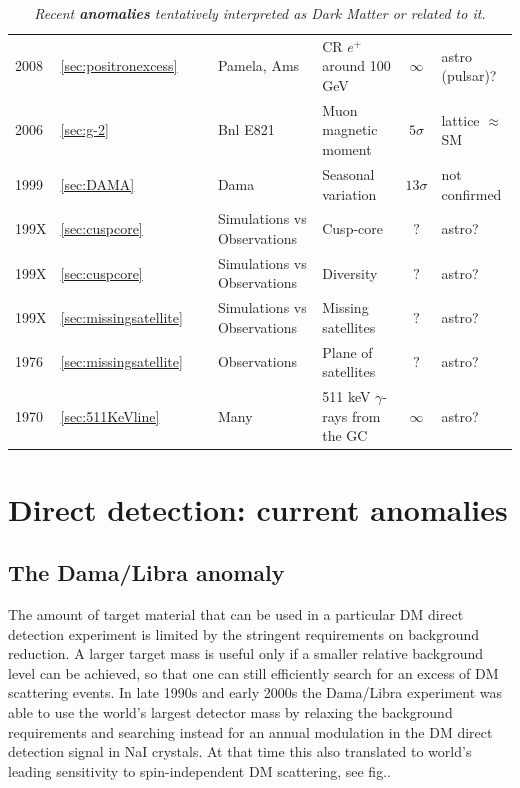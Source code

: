 \begin{table}[p]
\begin{tabular}{lllllcl}
%
\rowcolor{yellow!20} 2008 & \ref{sec:positronexcess}&\cite{positronexcess} & {\sc Pamela}, {\sc Ams} & CR $e^+$ around 100 GeV & $\infty$ 
& astro (pulsar)?\\
%
\rowcolor{red!50} 2006 & \ref{sec:g-2}&\cite{muong-2measurements} & {\sc Bnl E821} & Muon magnetic moment & $5\sigma$ 
& lattice $\approx$ SM\\
%
\rowcolor{red!30}1999 & \ref{sec:DAMA}&\cite{DAMA} & {\sc Dama} & Seasonal variation & $13\sigma$ 
& not confirmed\\
%
\rowcolor{orange!20}199X & \ref{sec:cuspcore} & \cite{corecusp} & Simulations vs Observations & Cusp-core & $?$ 
& astro?\\
%
\rowcolor{orange!20}199X & \ref{sec:cuspcore} & \cite{diversity} & Simulations vs Observations & Diversity & $?$ 
& astro?\\
%
\rowcolor{red!30}199X & \ref{sec:missingsatellite} &~\cite{missingsatellite} & Simulations vs Observations & Missing satellites & $?$ 
& astro?\\
%
\rowcolor{yellow!20}1976 & \ref{sec:missingsatellite} &~\cite{satellite_plane} & Observations & Plane of satellites & $?$ 
& astro?\\
%
\rowcolor{orange!20}1970 & \ref{sec:511KeVline}&\cite{511KeVline} & Many & 511 keV $\gamma$-rays from the GC &$\infty$  
& astro?\\
\end{tabular}
\caption[Anomalies]{\em Recent {\bfseries anomalies} tentatively interpreted as Dark Matter or related to it.
\label{tab:anomalies}}
\end{table}










\section{Direct detection: current anomalies}

\subsection{The {\sc Dama/Libra} anomaly}
\label{DAMA}
\label{sec:DAMA}
The amount of target material that can be used in a particular DM direct detection experiment 
is limited by the stringent requirements on background reduction. A larger target mass is useful only if a smaller relative background level can be achieved, so that one can still efficiently search for an excess of DM scattering events.
In late 1990s and early 2000s the {\sc Dama/Libra} experiment was able to use the world's largest detector mass by relaxing the background requirements and searching instead for an annual modulation in the DM direct detection signal in NaI crystals. At that time this also translated to world's leading sensitivity to spin-independent DM scattering, see fig..

